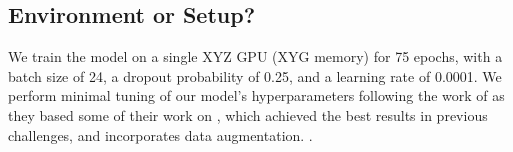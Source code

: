 \subsection{Environment or Setup?}
We train the model on a single XYZ GPU (XYG memory) for 75 epochs, with a batch size of 24, a dropout probability of 0.25, and a learning rate of 0.0001. We perform minimal tuning of our model's hyperparameters following the work
of  as they based some of their work on , which achieved the best results in previous challenges, and incorporates data augmentation.
.
